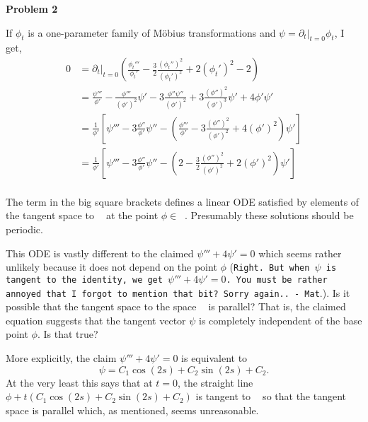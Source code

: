 \documentclass[12pt, a4paper]{amsart}
\newcommand{\mobius}{M\"{o}bius}
\DeclareMathOperator{\mobcircle}{M\ddot{o}b(\mathbb{S}^1)}
\begin{document}
\textbf{Problem 2}

If $\phi_t$ is a one-parameter family of \mobius{} transformations and $\psi = \partial_t|_{t=0} \phi_t$, I get,
\[
\begin{split}
0 &= \partial_t|_{t=0} \left(\frac{\phi_t'''}{\phi_t'} - \frac{3}{2} \frac{(\phi_t'')^2}{(\phi_t')^2} + 2(\phi_t')^2 - 2\right) \\
&= \frac{\psi'''}{\phi'} - \frac{\phi'''}{(\phi')^2} \psi' - 3\frac{\phi''\psi''}{(\phi')^2} + 3 \frac{(\phi'')^2}{(\phi')^3} \psi' + 4 \phi' \psi' \\
&= \frac{1}{\phi'} \left[\psi''' - 3 \frac{\phi''}{\phi'} \psi'' - \left(\frac{\phi'''}{\phi'} - 3 \frac{(\phi'')^2}{(\phi')^2} + 4 (\phi')^2 \right)\psi'\right] \\
&= \frac{1}{\phi'} \left[\psi''' - 3 \frac{\phi''}{\phi'} \psi'' - \left(2 -\frac{3}{2} \frac{(\phi'')^2}{(\phi')^2} + 2 (\phi')^2 \right)\psi'\right] \\
\end{split}
\]

The term in the big square brackets defines a linear ODE satisfied by elements of the tangent space to $\mobcircle$ at the point $\phi \in \mobcircle$. Presumably these solutions should be periodic.

This ODE is vastly different to the claimed $\psi''' + 4\psi' = 0$ which seems rather unlikely because it does not depend on the point $\phi$ (\texttt{Right. But when $\psi$ is tangent to the identity, we get $\psi'''+4\psi'=0$. You must be rather annoyed that I forgot to mention that bit? Sorry again.. - Mat}.). Is it possible that the tangent space to the space $\mobcircle$ is parallel? That is, the claimed equation suggests that the tangent vector $\psi$ is completely independent of the base point $\phi$. Is that true?

More explicitly, the claim $\psi''' + 4 \psi' = 0$ is equivalent to
\[
\psi = C_1 \cos(2s) + C_2 \sin(2s) + C_2.
\]
At the very least this says that at $t = 0$, the straight line $\phi + t(C_1 \cos(2s) + C_2 \sin(2s) + C_2)$ is tangent to $\mobcircle$ so that the tangent space is parallel which, as mentioned, seems unreasonable.
\end{document}
